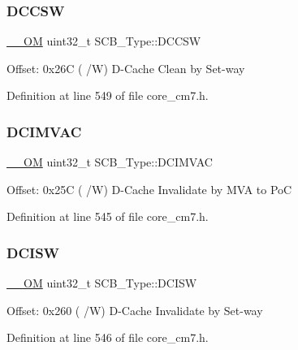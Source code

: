 \subsubsection{\texorpdfstring{D\+C\+C\+SW}{DCCSW}}
{\footnotesize\ttfamily \hyperlink{core__sc300_8h_a0ea2009ed8fd9ef35b48708280fdb758}{\+\_\+\+\_\+\+OM} uint32\+\_\+t S\+C\+B\+\_\+\+Type\+::\+D\+C\+C\+SW}

Offset\+: 0x26C ( /W) D-\/\+Cache Clean by Set-\/way 

Definition at line 549 of file core\+\_\+cm7.\+h.

\mbox{\label{struct_s_c_b___type_a4be79491ab1ed14f3b0237ba7e69063c}} 
\subsubsection{\texorpdfstring{D\+C\+I\+M\+V\+AC}{DCIMVAC}}
{\footnotesize\ttfamily \hyperlink{core__sc300_8h_a0ea2009ed8fd9ef35b48708280fdb758}{\+\_\+\+\_\+\+OM} uint32\+\_\+t S\+C\+B\+\_\+\+Type\+::\+D\+C\+I\+M\+V\+AC}

Offset\+: 0x25C ( /W) D-\/\+Cache Invalidate by M\+VA to PoC 

Definition at line 545 of file core\+\_\+cm7.\+h.

\mbox{\label{struct_s_c_b___type_a22bcfd7e1bffebdbe98cdbc8d77a2f42}} 
\subsubsection{\texorpdfstring{D\+C\+I\+SW}{DCISW}}
{\footnotesize\ttfamily \hyperlink{core__sc300_8h_a0ea2009ed8fd9ef35b48708280fdb758}{\+\_\+\+\_\+\+OM} uint32\+\_\+t S\+C\+B\+\_\+\+Type\+::\+D\+C\+I\+SW}

Offset\+: 0x260 ( /W) D-\/\+Cache Invalidate by Set-\/way 

Definition at line 546 of file core\+\_\+cm7.\+h.

\mbox{\label{struct_s_c_b___type_a85dd6fe77aab17e7ea89a52c59da6004}} 
